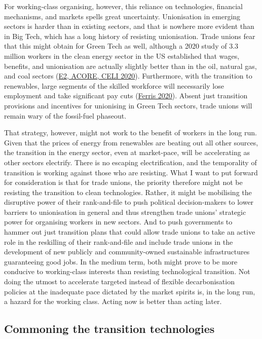 \documentclass[a4paper, nobind]{templates/ociamthesis}
\begin{document}
For working-class organising, however, this reliance on technologies, financial mechanisms, and markets spells great uncertainty. Unionisation in emerging sectors is harder than in existing sectors, and that is nowhere more evident than in Big Tech, which has a long history of resisting unionisation. Trade unions fear that this might obtain for Green Tech as well, although a 2020 study of 3.3 million workers in the clean energy sector in the US established that wages, benefits, and unionisation are actually slightly better than in the oil, natural gas, and coal sectors (\protect\hyperlink{ref-e2_acore_celi_clean_2020}{E2, ACORE, CELI 2020}). Furthermore, with the transition to renewables, large segments of the skilled workforce will necessarily lose employment and take significant pay cuts (\protect\hyperlink{ref-ferris_oil_2020}{Ferris 2020}). Absent just transition provisions and incentives for unionising in Green Tech sectors, trade unions will remain wary of the fossil-fuel phaseout.

That strategy, however, might not work to the benefit of workers in the long run. Given that the prices of energy from renewables are beating out all other sources, the transition in the energy sector, even at market-pace, will be accelerating as other sectors electrify. There is no escaping electrification, and the temporality of transition is working against those who are resisting. What I want to put forward for consideration is that for trade unions, the priority therefore might not be resisting the transition to clean technologies. Rather, it might be mobilising the disruptive power of their rank-and-file to push political decision-makers to lower barriers to unionisation in general and thus strengthen trade unions' strategic power for organising workers in new sectors. And to push governments to hammer out just transition plans that could allow trade unions to take an active role in the reskilling of their rank-and-file and include trade unions in the development of new publicly and community-owned sustainable infrastructures guaranteeing good jobs. In the medium term, both might prove to be more conducive to working-class interests than resisting technological transition. Not doing the utmost to accelerate targeted instead of flexible decarbonisation policies at the inadequate pace dictated by the market spirits is, in the long run, a hazard for the working class. Acting now is better than acting later.

\hypertarget{commoning-the-transition-technologies}{%
\subsection{Commoning the transition technologies}\label{commoning-the-transition-technologies}}
\end{document}
